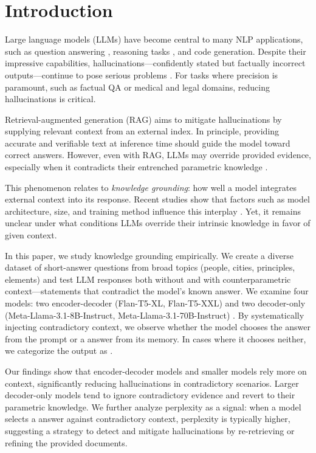 \section{Introduction}

Large language models (LLMs) have become central to many NLP applications, such as question answering \citep{gpt3,how_can_we_know}, reasoning tasks \citep{treeofthoughts}, and code generation. Despite their impressive capabilities, hallucinations—confidently stated but factually incorrect outputs—continue to pose serious problems \citep{how_can_we_know}. For tasks where precision is paramount, such as factual QA or medical and legal domains, reducing hallucinations is critical.

Retrieval-augmented generation (RAG) \citep{rag} aims to mitigate hallucinations by supplying relevant context from an external index. In principle, providing accurate and verifiable text at inference time should guide the model toward correct answers. However, even with RAG, LLMs may override provided evidence, especially when it contradicts their entrenched parametric knowledge \citep{factual_recall,ragged}.

This phenomenon relates to \emph{knowledge grounding}: how well a model integrates external context into its response. Recent studies show that factors such as model architecture, size, and training method influence this interplay \citep{factual_recall,flant5,llama}. Yet, it remains unclear under what conditions LLMs override their intrinsic knowledge in favor of given context.

In this paper, we study knowledge grounding empirically. We create a diverse dataset of short-answer questions from broad topics (people, cities, principles, elements) and test LLM responses both without and with counterparametric context—statements that contradict the model's known answer. We examine four models: two encoder-decoder (Flan-T5-XL, Flan-T5-XXL) \citep{t5,flant5} and two decoder-only (Meta-Llama-3.1-8B-Instruct, Meta-Llama-3.1-70B-Instruct) \citep{llama3}. By systematically injecting contradictory context, we observe whether the model chooses the \Contextual{} answer from the prompt or a \Parametric{} answer from its memory. In cases where it chooses neither, we categorize the output as \Other{}.

Our findings show that encoder-decoder models and smaller models rely more on context, significantly reducing hallucinations in contradictory scenarios. Larger decoder-only models tend to ignore contradictory evidence and revert to their parametric knowledge. We further analyze perplexity as a signal: when a model selects a \Parametric{} answer against contradictory context, perplexity is typically higher, suggesting a strategy to detect and mitigate hallucinations by re-retrieving or refining the provided documents.

